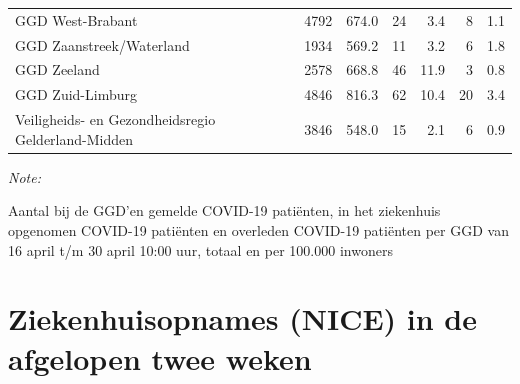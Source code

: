 \documentclass[
  english,
  man,floatsintext]{apa6}
\begin{document}
\begin{table}
\begin{threeparttable}
\begin{tabular}{lrrrrrr}
GGD West-Brabant & 4792 & 674.0 & 24 & 3.4 & 8 & 1.1\\
GGD Zaanstreek/Waterland & 1934 & 569.2 & 11 & 3.2 & 6 & 1.8\\
GGD Zeeland & 2578 & 668.8 & 46 & 11.9 & 3 & 0.8\\
GGD Zuid-Limburg & 4846 & 816.3 & 62 & 10.4 & 20 & 3.4\\
Veiligheids- en Gezondheidsregio Gelderland-Midden & 3846 & 548.0 & 15 & 2.1 & 6 & 0.9\\
\bottomrule
\end{tabular}
\begin{tablenotes}
\item \textit{Note: } 
\item Aantal bij de GGD’en gemelde COVID-19 patiënten, in het ziekenhuis opgenomen COVID-19 patiënten en overleden COVID-19 patiënten per GGD van 16 april t/m 30 april 10:00 uur, totaal en per 100.000 inwoners
\end{tablenotes}
\end{threeparttable}
\endgroup{}
\end{table}

\newpage

\hypertarget{ziekenhuisopnames-nice-in-de-afgelopen-twee-weken}{%
\section{Ziekenhuisopnames (NICE) in de afgelopen twee weken}\label{ziekenhuisopnames-nice-in-de-afgelopen-twee-weken}}
\end{document}
